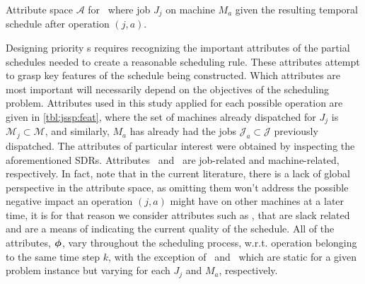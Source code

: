 \documentclass[smallextended]{svjour3}
\begin{document}
	\begin{table}[t!] \centering
		\caption[Attribute space $\mathcal{A}$ for \JSP]{Attribute space 
			$\mathcal{A}$ for \JSP\ where job $J_j$ on machine $M_a$ given the 
			resulting temporal schedule after operation $(j,a)$.
		}
		\label{tbl:jssp:feat}
		{\setlength{\tabcolsep}{3pt} }
	\end{table}
	
	Designing priority \dr s requires recognizing the important 
	attributes of the partial schedules needed to create a reasonable scheduling rule. 
	These attributes attempt to grasp key features of the schedule being 
	constructed. Which attributes are most important will necessarily depend on the
	objectives of the scheduling problem. 
	Attributes used in this study applied for 
	each possible operation are given in \cref{tbl:jssp:feat}, where the set of 
	machines already dispatched for $J_j$ is $\mathcal{M}_j\subset\mathcal{M}$, 
	and similarly, $M_a$ has already had the jobs $\mathcal{J}_a\subset\mathcal{J}$ 
	previously dispatched.
	The attributes of particular interest were obtained by inspecting the 
	aforementioned SDRs. Attributes \phiJobRelated\ and \phiMacRelated\ are 
	job-related and machine-related, respectively.
	In fact, \cite{Pickardt2013} note that in the current literature, there is a 
	lack of global perspective in the attribute space, as omitting them won't 
	address the possible negative impact an operation $(j,a)$ might have on other 
	machines at a later time, it is for that reason we consider attributes such as 
	\phiSlackRelated, that are slack related and are a means of indicating the 
	current quality of the schedule.
	All of the attributes, $\bm{\phi}$, vary throughout the scheduling process, 
	w.r.t. operation belonging to the same time step $k$, with the exception of 
	\phijobTotProcTime\ and \phimacTotProcTime\ which are static for a given 
	problem instance but varying for each $J_j$ and $M_a$, respectively. 
	
\end{document}
